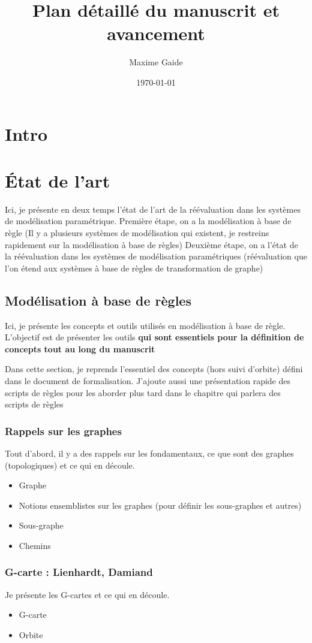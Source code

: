 \documentclass[11pt]{article}
\author{Maxime Gaide}
\date{\today}
\title{Plan détaillé du manuscrit et avancement}
\begin{document}
\maketitle
\tableofcontents


\section{Intro}
\label{sec:orgd19ed1e}
\section{État de l'art}
\label{sec:org8e13229}
Ici, je présente en deux temps l'état de l'art de la réévaluation dans les systèmes de modélisation paramétrique.
Première étape, on a la modélisation à base de règle (Il y a plusieurs systèmes de modélisation qui existent, je restreins rapidement sur la modélisation à base de règles)
Deuxième étape, on a l'état de la réévaluation dans les systèmes de modélisation paramétriques (réévaluation que l'on étend aux systèmes à base de règles de transformation de graphe)
\subsection{Modélisation à base de règles}
\label{sec:org9264d31}
Ici, je présente les concepts et outils utilisés en modélisation à base de règle.
L'objectif est de présenter les outils \textbf{qui sont essentiels pour la définition de concepts tout au long du manuscrit}

Dans cette section, je reprends l'essentiel des concepts (hors suivi d'orbite) défini dans le document de formalisation.
J'ajoute aussi une présentation rapide des scripts de règles pour les aborder plus tard dans le chapitre qui parlera des scripts de règles
\subsubsection{Rappels sur les graphes}
\label{sec:orgc2a6ace}
Tout d'abord, il y a des rappels sur les fondamentaux, ce que sont des graphes (topologiques) et ce qui en découle.
\begin{itemize}
\item Graphe
\item Notions ensemblistes sur les graphes (pour définir les sous-graphes et autres)
\item Sous-graphe
\item Chemins
\end{itemize}
\subsubsection{G-carte : Lienhardt, Damiand}
\label{sec:orgafc2c2b}
Je présente les G-cartes et ce qui en découle.
\begin{itemize}
\item G-carte
\item Orbite
\end{itemize}
\end{document}
